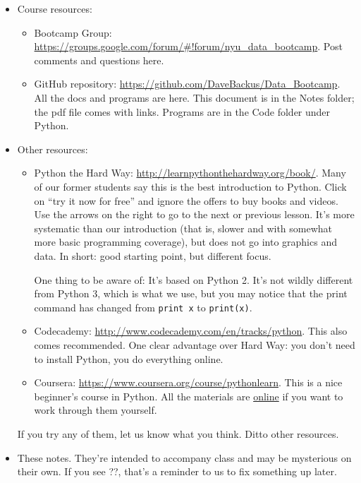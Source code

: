 \documentclass[11pt]{article}
\begin{document}
\begin{itemize}
\item Course resources:
\begin{itemize}
\item Bootcamp Group:  \url{https://groups.google.com/forum/#!forum/nyu_data_bootcamp}.
Post comments and questions here.

\item GitHub repository:  \url{https://github.com/DaveBackus/Data_Bootcamp}.
All the docs and programs are here.
This document is in the Notes folder;
the pdf file comes with links.
Programs are in the Code folder under Python.
\end{itemize}

\item Other resources:
%
\begin{itemize}
\item {Python the Hard Way}:  \url{http://learnpythonthehardway.org/book/}.
Many of our former students say this is the best introduction to Python.
Click on ``try it now for free'' and ignore the offers to buy books and videos.
Use the arrows on the right to go to the next or previous lesson.
It's more systematic than our introduction
(that is, slower and with somewhat more basic programming coverage),
but does not go into graphics and data.
In short:  good starting point, but different focus.

One thing to be aware of:  It's based on Python 2.
It's not wildly different from Python 3, which is what we use,
but you may notice that the print command has changed from {\tt print x} to {\tt print(x)}.

\item Codecademy:  \url{http://www.codecademy.com/en/tracks/python}.
This also comes recommended.
One clear advantage over Hard Way:  you don't need to install Python,
you do everything online.

\item Coursera:  \url{https://www.coursera.org/course/pythonlearn}.
This is a nice beginner's course in Python.
All the materials are
\href{http://open.umich.edu/education/si/coursera-programming-everybody/winter2014}{online}
if you want to work through them yourself.
\end{itemize}
If you try any of them, let us know what you think.  Ditto other resources.

\item These notes.
They're intended to accompany class and may be mysterious
on their own.
If you see ??, that's a reminder to us to fix something up later.
\end{itemize}
\end{document}
